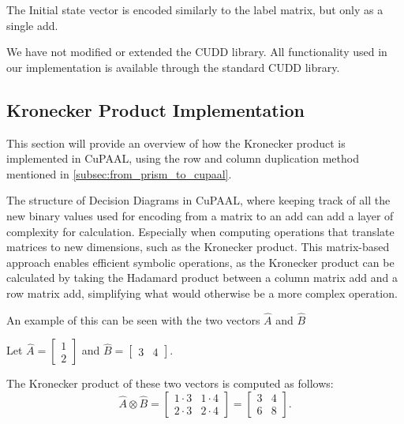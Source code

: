 The Initial state vector is encoded similarly to the label matrix, but only as a single \gls{add}.

We have not modified or extended the CUDD library.
All functionality used in our implementation is available through the standard CUDD library.


\subsection{Kronecker Product Implementation}\label{subsec:kronecker-product-implementation}
This section will provide an overview of how the Kronecker product is implemented in CuPAAL, using the row and column duplication method mentioned in \autoref{subsec:from_prism_to_cupaal}.

The structure of Decision Diagrams in CuPAAL, where keeping track of all the new binary values used for encoding from a matrix to an \gls{add} can add a layer of complexity for calculation.
Especially when computing operations that translate matrices to new dimensions, such as the Kronecker product.
This matrix-based approach enables efficient symbolic operations, as the Kronecker product can be calculated by taking the Hadamard product between a column matrix \gls{add} and a row matrix \gls{add}, simplifying what would otherwise be a more complex operation.

An example of this can be seen with the two vectors $\hat{A}$ and $\hat{B}$

Let $\hat{A} = \begin{bmatrix}
        1 \\
        2
    \end{bmatrix}$
and $\hat{B}=\begin{bmatrix}
        3 & 4
    \end{bmatrix}$.

The Kronecker product of these two vectors is computed as follows:
\begin{equation}
    \hat{A} \otimes \hat{B} = \begin{bmatrix}
        1 \cdot 3 & 1 \cdot 4 \\
        2 \cdot 3 & 2 \cdot 4
    \end{bmatrix} = \begin{bmatrix}
        3 & 4 \\
        6 & 8
    \end{bmatrix}.
    \label{eq:kronecker-product-example}
\end{equation}

